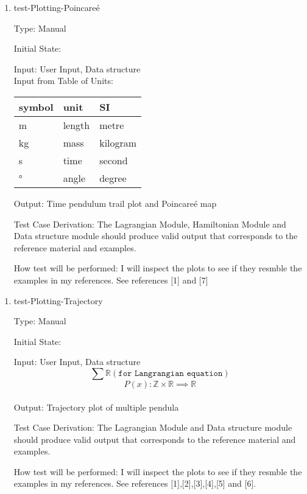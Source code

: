 \documentclass[12pt, titlepage]{article}
\begin{document}
\begin{enumerate}				
	\item{test-Plotting-Poincare\'{e}\\}
	
	Type: Manual
	
	Initial State: 
	
	Input: User Input, Data structure\\
	Input from Table of Units:\\
  \noindent \begin{tabular}{l l l} 
    \toprule		
    \textbf{symbol} & \textbf{unit} & \textbf{SI}\\
    \midrule 
    \si{\metre} & length & metre\\
    \si{\kilogram} & mass & kilogram\\
    \si{\second} & time & second\\
    \si{\degree} & angle & degree\\
    \bottomrule
  \end{tabular}
	
	Output: Time pendulum trail plot and Poincare\'{e} map
	
	Test Case Derivation: The Lagrangian Module, Hamiltonian Module and Data structure module should produce valid
	output that corresponds to the reference material and examples.
	
	How test will be performed: I will inspect the plots to see if 
	they resmble the examples in my references. See references [1] and [7]
\end{enumerate} 

\begin{enumerate}				
	\item{test-Plotting-Trajectory\\}
	
	Type: Manual
	
	Initial State: 
	
	Input: User Input, Data structure
$$\sum \mathbb{R} (\texttt{for Langrangian equation})$$
$$ P(x) :\mathbb{Z} \times \mathbb{R} \implies \mathbb{R}$$\\
	
	Output: Trajectory plot of multiple pendula
	
	Test Case Derivation: The Lagrangian Module and Data structure module should produce valid
	output that corresponds to the reference material and examples.
	
	How test will be performed: I will inspect the plots to see if 
	they resmble the examples in my references. See references [1],[2],[3],[4],[5] and [6].
\end{enumerate}
\end{document}
